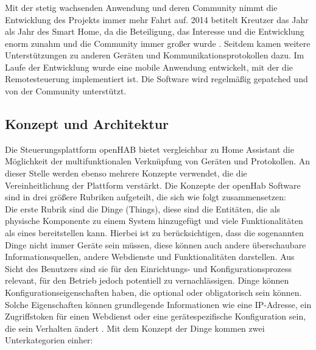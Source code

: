 \subsubsection*{}
Mit der stetig wachsenden Anwendung und deren Community nimmt die Entwicklung des Projekts immer mehr Fahrt auf. 2014 betitelt 
Kreutzer das Jahr als Jahr des Smart Home, da die Beteiligung, das Interesse und die Entwicklung enorm zunahm und die Community immer 
großer wurde \cite{kaikreutzer2014}. Seitdem kamen weitere Unterstützungen zu anderen Geräten und 
Kommunikationsprotokollen dazu. Im Laufe der Entwicklung wurde eine mobile Anwendung entwickelt, mit der die Remotesteuerung 
implementiert ist. Die Software wird regelmäßig gepatched und von der Community unterstützt.

\subsection{Konzept und Architektur}
    Die Steuerungsplattform openHAB bietet vergleichbar zu Home Assistant die Möglichkeit der multifunktionalen Verknüpfung von 
    Geräten und Protokollen. An dieser Stelle werden ebenso mehrere Konzepte verwendet, die die Vereinheitlichung der Plattform 
    verstärkt. Die Konzepte der openHab Software sind in drei größere Rubriken aufgeteilt, die sich wie folgt zusammensetzen:
    \\
    \linebreak
    Die erste Rubrik sind die Dinge (Things), diese sind die Entitäten, die als physische Komponente zu einem System hinzugefügt 
    und viele Funktionalitäten als eines bereitstellen kann. Hierbei ist zu berücksichtigen, dass die sogenannten Dinge nicht 
    immer Geräte sein müssen, diese können auch andere überschaubare Informationsquellen, andere Webdienste und Funktionalitäten 
    darstellen. Aus Sicht des Benutzers sind sie für den Einrichtungs- und Konfigurationsprozess relevant, für den Betrieb 
    jedoch potentiell zu vernachlässigen. Dinge können Konfigurationseigenschaften haben, die optional oder obligatorisch sein 
    können. Solche Eigenschaften können grundlegende Informationen wie eine IP-Adresse, ein Zugriffstoken für einen Webdienst 
    oder eine gerätespezifische Konfiguration sein, die sein Verhalten ändert \cite{openHAB-article}. Mit dem Konzept der Dinge 
    kommen zwei Unterkategorien einher:
